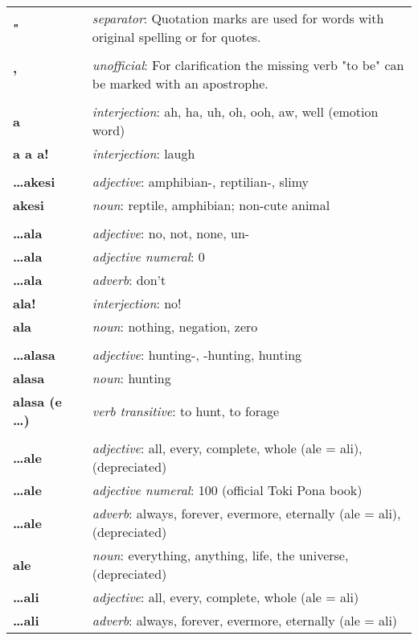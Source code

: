 \begin{supertabular}{p{2,5cm}|ll}
\textbf{"} && \textit{separator}: Quotation marks are used for words with original spelling or for quotes. \\ 
 && \\ %
\textbf{'} && \textit{unofficial}: For clarification the missing verb "to be" can be marked with an apostrophe.  \\ 
 && \\ %
\textbf{a} && \textit{interjection}: ah, ha, uh, oh, ooh, aw, well (emotion word) \\ 
\textbf{a a a!} && \textit{interjection}: laugh \\ 
 && \\ %
\textbf{\dots akesi} && \textit{adjective}: amphibian-, reptilian-, slimy \\ 
\textbf{akesi} && \textit{noun}: reptile, amphibian; non-cute animal \\ 
 && \\ %
\textbf{\dots ala} && \textit{adjective}: no, not, none, un- \\ 
\textbf{\dots ala} && \textit{adjective numeral}: 0 \\ 
\textbf{\dots ala} && \textit{adverb}: don't \\ 
\textbf{ala!} && \textit{interjection}: no! \\ 
\textbf{ala} && \textit{noun}: nothing, negation, zero \\ 
 && \\ %
\textbf{\dots alasa} && \textit{adjective}: hunting-, -hunting, hunting \\ 
\textbf{alasa} && \textit{noun}: hunting \\ 
\textbf{alasa (e \dots)} && \textit{verb transitive}: to hunt, to forage \\ 
 && \\ %
\textbf{\dots ale} && \textit{adjective}: all, every, complete, whole (ale = ali), (depreciated) \\ 
\textbf{\dots ale} && \textit{adjective numeral}: 100 (official Toki Pona book) \\ 
\textbf{\dots ale} && \textit{adverb}: always, forever, evermore, eternally (ale = ali), (depreciated) \\ 
\textbf{ale} && \textit{noun}: everything, anything, life, the universe, (depreciated) \\ 
\textbf{\dots ali} && \textit{adjective}: all, every, complete, whole (ale = ali) \\ 
\textbf{\dots ali} && \textit{adverb}: always, forever, evermore, eternally (ale = ali) \\ 

\end{supertabular}

